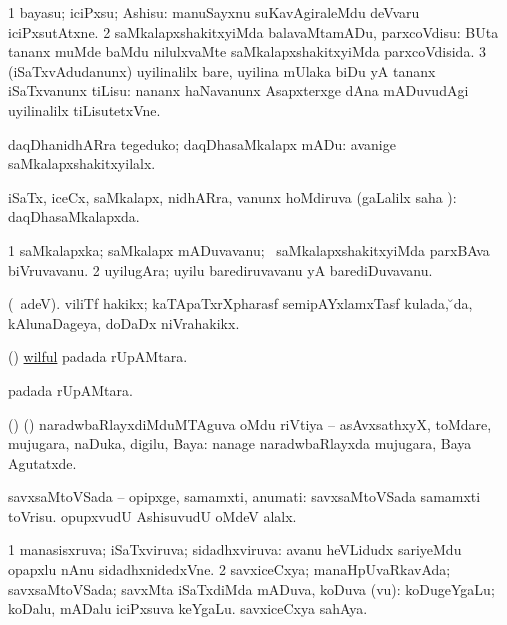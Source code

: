 \bentry
{} 
\gl{\sakirx}
\bmng
\bnum
\num{1} bayasu; iciPxsu; Ashisu:  manuSayxnu suKavAgiraleMdu deVvaru iciPxsutAtxne. 
\num{2} saMkalapxshakitxyiMda balavaMtamADu, parxcoVdisu:  BUta tananx muMde baMdu nilulxvaMte saMkalapxshakitxyiMda parxcoVdisida. 
\num{3} (iSaTxvAdudanunx) uyilinalilx bare, uyilina mUlaka biDu yA tananx iSaTxvanunx tiLisu:  nananx haNavanunx Asapxterxge dAna mADuvudAgi uyilinalilx tiLisutetxVne. 
\enum
\emng

\noindent 
\gl{\akirx}
\bmng
daqDhanidhARra tegeduko; daqDhasaMkalapx mADu:  avanige saMkalapxshakitxyilalx. 
\emng
\eentry

\bentry
{}
\gl{\gu}
\bmng
iSaTx, iceCx, saMkalapx, nidhARra, \mo vanunx hoMdiruva (\saMpa gaLalilx saha \parx):  daqDhasaMkalapxda. 
\emng
\eentry

\bentry
{}
\gl{\nA}
\bmng
\bnum
\num{1} saMkalapxka; saMkalapx mADuvavanu; \kanmu\ saMkalapxshakitxyiMda parxBAva biVruvavanu. 
\num{2} uyilugAra; uyilu barediruvavanu yA barediDuvavanu. 
\enum
\emng
\eentry

\bentry
{}
\gl{\nA}
\bmng
(\bava\ adeV). viliTf hakikx; kaTApaTxrXpharasf semipAYxlamxTasf kulada, \u \ame da, kAlunaDageya, doDaDx niVrahakikx. 
\emng
\eentry

\bentry
{} 
\gl{\gu}
\expl{}
\bmng
(\ame) \hyperlink{wilful}{wilful} padada rUpAMtara. 
\emng
\eentry

\bentry
{}
\gl{\nA}
\bmng
{} padada rUpAMtara. 
\emng
\eentry

\bentry
{}
\gl{\nA}
\bmng
(\bava) (\AmA) naradwbaRlayxdiMduMTAguva oMdu riVtiya -- asAvxsathxyX, toMdare, mujugara, naDuka, digilu, Baya:  nanage naradwbaRlayxda mujugara, Baya Agutatxde. 
\emng
\eentry

\bentry
{} 
\gl{\nA}
\expl{}
\bmng
savxsaMtoVSada -- opipxge, samamxti, anumati:  savxsaMtoVSada samamxti toVrisu.  opupxvudU AshisuvudU oMdeV alalx. 
\emng
\eentry

\bentry
{} 
\gl{\gu}
\bmng
\bnum
\num{1} manasisxruva; iSaTxviruva; sidadhxviruva:  avanu heVLidudx sariyeMdu opapxlu nAnu sidadhxnidedxVne. 
\num{2} savxiceCxya; manaHpUvaRkavAda; savxsaMtoVSada; savxMta iSaTxdiMda mADuva, koDuva (\mo vu):  koDugeYgaLu; koDalu, mADalu iciPxsuva keYgaLu.  savxiceCxya sahAya. 
\enum
\emng

